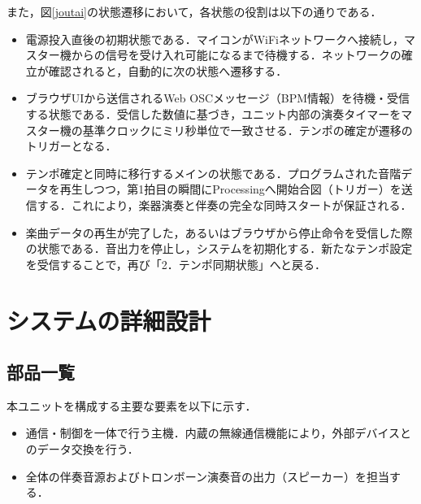 \documentclass[uplatex,dvipdfmx]{jsarticle}
\begin{document}
また，図\ref{joutai}の状態遷移において，各状態の役割は以下の通りである．

\begin{itemize}
\item {}
電源投入直後の初期状態である．マイコンがWiFiネットワークへ接続し，マスター機からの信号を受け入れ可能になるまで待機する．ネットワークの確立が確認されると，自動的に次の状態へ遷移する．
\item {}
ブラウザUIから送信されるWeb OSCメッセージ（BPM情報）を待機・受信する状態である．受信した数値に基づき，ユニット内部の演奏タイマーをマスター機の基準クロックにミリ秒単位で一致させる．テンポの確定が遷移のトリガーとなる．
\item {}
テンポ確定と同時に移行するメインの状態である．プログラムされた音階データを再生しつつ，第1拍目の瞬間にProcessingへ開始合図（トリガー）を送信する．これにより，楽器演奏と伴奏の完全な同時スタートが保証される．
\item {}
楽曲データの再生が完了した，あるいはブラウザから停止命令を受信した際の状態である．音出力を停止し，システムを初期化する．新たなテンポ設定を受信することで，再び「2．テンポ同期状態」へと戻る．
\end{itemize}

\section{\textbf{システムの詳細設計}}

\subsection{\textbf{部品一覧}}
本ユニットを構成する主要な要素を以下に示す．
\begin{itemize}
\item {} 通信・制御を一体で行う主機．内蔵の無線通信機能により，外部デバイスとのデータ交換を行う．
\item {} 全体の伴奏音源およびトロンボーン演奏音の出力（スピーカー）を担当する．
\end{itemize}

\end{document}
